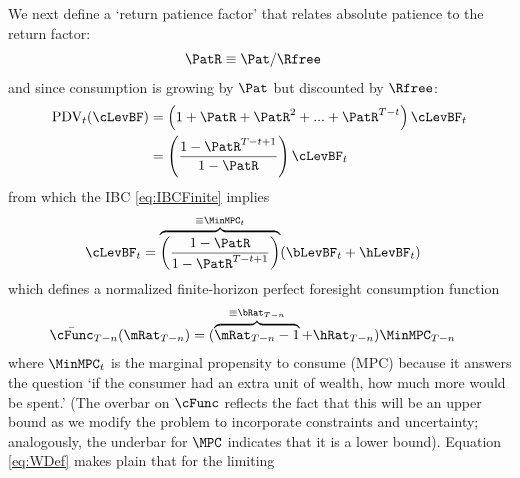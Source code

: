 \documentclass[BufferStockTheory]{subfiles}
\begin{document}
We next define a `return patience factor' that relates absolute patience to the return factor:
\begin{equation}\begin{gathered}\begin{aligned}
  \PatR  & \equiv  {\Pat}/\Rfree \label{eq:PatR}
\end{aligned}\end{gathered}\end{equation}
and since consumption is growing by $\Pat$ but discounted by $\Rfree$:
\begin{equation}\begin{gathered}\begin{aligned}
  \text{PDV}_{t}(\cLevBF)  & = \left(1+\PatR+\PatR^{2}+...+ \PatR^{T-t}\right)\cLevBF_{t} \notag
  \\  & = \left(\frac{1-\PatR^{T-t+1}}{1-\PatR}\right)\cLevBF_{t}
\end{aligned}\end{gathered}\end{equation}
from which the IBC \eqref{eq:IBCFinite} implies
\begin{equation}\begin{gathered}\begin{aligned}
  \cLevBF_{t}  & = \overbrace{\left(\frac{1-\PatR}{1-\PatR^{T-t+1}}\right)}^{\equiv \MinMPC_{t}}
                 (\bLevBF_{t}+\hLevBF_{t})   \label{eq:WDef}
\end{aligned}\end{gathered}\end{equation}
which defines a normalized finite-horizon perfect foresight consumption function
\begin{equation}\begin{gathered}\begin{aligned}
  \bar{\cFunc}_{T-n}(\mRat_{T-n})  & = (\overbrace{\mRat_{T-n}-1}^{
                                     \equiv\bRat_{T-n}}+\hRat_{T-n})\MinMPC_{T-n}
\end{aligned}\end{gathered}\end{equation}
where $\MinMPC_{t}$ is the marginal propensity to consume (MPC) because it answers the
question `if the consumer had an extra unit of wealth, how much more would be spent.' \hypertarget{RIC}{}
(The overbar on $\cFunc$ reflects the fact that this will be an upper bound as we modify the problem to incorporate constraints and uncertainty; analogously, the underbar for $\MPC$ indicates that it is a lower bound).
Equation \eqref{eq:WDef} makes plain that for the limiting
\end{document}
